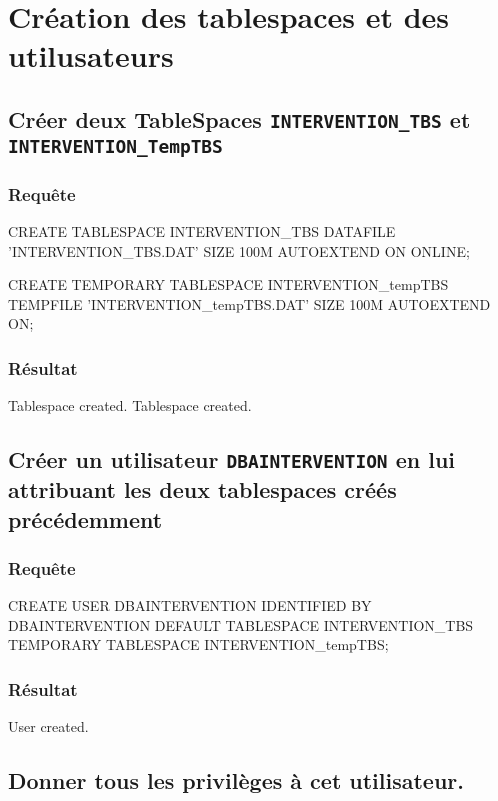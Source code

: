 \documentclass[•]{article}
\begin{document}
\def\reportnumber{1}

\section{Création des tablespaces et des utilusateurs}
\subsection{Créer deux TableSpaces \texttt{INTERVENTION\_TBS} et \texttt{INTERVENTION\_TempTBS}}
\subsubsection{Requête}
\begin{sql}
CREATE TABLESPACE INTERVENTION_TBS
DATAFILE 'INTERVENTION_TBS.DAT'
SIZE 100M
AUTOEXTEND ON
ONLINE;

CREATE TEMPORARY TABLESPACE INTERVENTION_tempTBS
TEMPFILE 'INTERVENTION_tempTBS.DAT'
SIZE 100M
AUTOEXTEND ON;
\end{sql}
\subsubsection{Résultat}
\begin{sql}
Tablespace created.
Tablespace created.
\end{sql}
\subsection{Créer un utilisateur \texttt{DBAINTERVENTION} en lui attribuant les deux tablespaces créés précédemment}
\subsubsection{Requête}
\begin{sql}
CREATE USER DBAINTERVENTION
IDENTIFIED BY DBAINTERVENTION
DEFAULT TABLESPACE INTERVENTION_TBS
TEMPORARY TABLESPACE INTERVENTION_tempTBS;
\end{sql}
\subsubsection{Résultat}
\begin{sql}
User created.
\end{sql}
\subsection{Donner tous les privilèges à cet utilisateur.}
\end{document}
